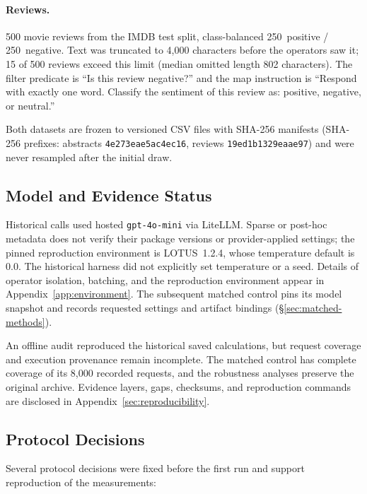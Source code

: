 \documentclass[11pt]{article}
\begin{document}
\paragraph{Reviews.}
500 movie reviews from the IMDB test split, class-balanced 250~positive /
250~negative. Text was truncated to 4{,}000 characters before the operators
saw it; 15 of 500 reviews exceed this limit (median omitted length 802
characters). The filter predicate is ``Is this review negative?'' and the map
instruction is ``Respond with exactly one word. Classify the sentiment of this
review as: positive, negative, or neutral.''

Both datasets are frozen to versioned CSV files with SHA-256 manifests
(SHA-256 prefixes: abstracts \texttt{4e273eae5ac4ec16}, reviews
\texttt{19ed1b1329eaae97}) and
were never resampled after the initial draw.

\subsection{Model and Evidence Status}
Historical calls used hosted \texttt{gpt-4o-mini} via LiteLLM. Sparse or post-hoc
metadata does not verify their package versions or provider-applied settings;
the pinned reproduction environment is LOTUS~1.2.4, whose temperature default
is 0.0. The historical harness did not explicitly set temperature or a seed.
Details of operator isolation, batching, and the reproduction environment
appear in Appendix~\ref{app:environment}. The subsequent matched control
pins its model snapshot and records requested settings and artifact bindings
(\S\ref{sec:matched-methods}).

An offline audit reproduced the historical saved calculations, but request
coverage and execution provenance remain incomplete. The matched control
has complete coverage of its 8,000 recorded requests, and the robustness
analyses preserve the original archive. Evidence layers, gaps, checksums,
and reproduction commands are disclosed in Appendix~\ref{sec:reproducibility}.

\subsection{Protocol Decisions}

Several protocol decisions were fixed before the first run and support
reproduction of the measurements:
\end{document}
